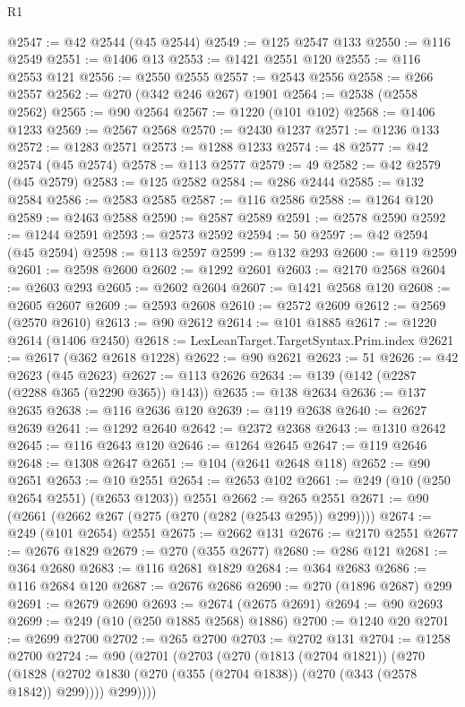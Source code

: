 \begin{lexlean}{R1}
\begin{coremodule}
@2547 := @42 @2544 (@45 @2544)
@2549 := @125 @2547 @133
@2550 := @116 @2549
@2551 := @1406 @13
@2553 := @1421 @2551 @120
@2555 := @116 @2553 @121
@2556 := @2550 @2555
@2557 := @2543 @2556
@2558 := @266 @2557
@2562 := @270 (@342 @246 @267) @1901
@2564 := @2538 (@2558 @2562)
@2565 := @90 @2564
@2567 := @1220 (@101 @102)
@2568 := @1406 @1233
@2569 := @2567 @2568
@2570 := @2430 @1237
@2571 := @1236 @133
@2572 := @1283 @2571
@2573 := @1288 @1233
@2574 := 48
@2577 := @42 @2574 (@45 @2574)
@2578 := @113 @2577
@2579 := 49
@2582 := @42 @2579 (@45 @2579)
@2583 := @125 @2582
@2584 := @286 @2444
@2585 := @132 @2584
@2586 := @2583 @2585
@2587 := @116 @2586
@2588 := @1264 @120
@2589 := @2463 @2588
@2590 := @2587 @2589
@2591 := @2578 @2590
@2592 := @1244 @2591
@2593 := @2573 @2592
@2594 := 50
@2597 := @42 @2594 (@45 @2594)
@2598 := @113 @2597
@2599 := @132 @293
@2600 := @119 @2599
@2601 := @2598 @2600
@2602 := @1292 @2601
@2603 := @2170 @2568
@2604 := @2603 @293
@2605 := @2602 @2604
@2607 := @1421 @2568 @120
@2608 := @2605 @2607
@2609 := @2593 @2608
@2610 := @2572 @2609
@2612 := @2569 (@2570 @2610)
@2613 := @90 @2612
@2614 := @101 @1885
@2617 := @1220 @2614 (@1406 @2450)
@2618 := LexLeanTarget.TargetSyntax.Prim.index
@2621 := @2617 (@362 @2618 @1228)
@2622 := @90 @2621
@2623 := 51
@2626 := @42 @2623 (@45 @2623)
@2627 := @113 @2626
@2634 := @139 (@142 (@2287 (@2288 @365 (@2290 @365)) @143))
@2635 := @138 @2634
@2636 := @137 @2635
@2638 := @116 @2636 @120
@2639 := @119 @2638
@2640 := @2627 @2639
@2641 := @1292 @2640
@2642 := @2372 @2368
@2643 := @1310 @2642
@2645 := @116 @2643 @120
@2646 := @1264 @2645
@2647 := @119 @2646
@2648 := @1308 @2647
@2651 := @104 (@2641 @2648 @118)
@2652 := @90 @2651
@2653 := @10 @2551
@2654 := @2653 @102
@2661 := @249 (@10 (@250 @2654 @2551) (@2653 @1203)) @2551
@2662 := @265 @2551
@2671 := @90 (@2661 (@2662 @267 (@275 (@270 (@282 (@2543 @295)) @299))))
@2674 := @249 (@101 @2654) @2551
@2675 := @2662 @131
@2676 := @2170 @2551
@2677 := @2676 @1829
@2679 := @270 (@355 @2677)
@2680 := @286 @121
@2681 := @364 @2680
@2683 := @116 @2681 @1829
@2684 := @364 @2683
@2686 := @116 @2684 @120
@2687 := @2676 @2686
@2690 := @270 (@1896 @2687) @299
@2691 := @2679 @2690
@2693 := @2674 (@2675 @2691)
@2694 := @90 @2693
@2699 := @249 (@10 (@250 @1885 @2568) @1886)
@2700 := @1240 @20
@2701 := @2699 @2700
@2702 := @265 @2700
@2703 := @2702 @131
@2704 := @1258 @2700
@2724 := @90
    (@2701
      (@2703
        (@270
          (@1813 (@2704 @1821))
          (@270
            (@1828 (@2702 @1830 (@270 (@355 (@2704 @1838)) (@270 (@343 (@2578 @1842)) @299))))
            @299))))

\end{coremodule}
\end{lexlean}
